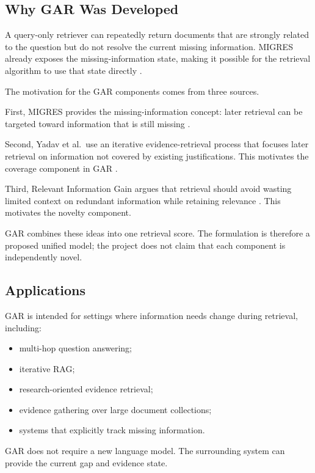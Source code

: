 \documentclass[11pt,a4paper]{article}
\begin{document}
\subsection{Why GAR Was Developed}

A query-only retriever can repeatedly return documents that are strongly related to the question but do not resolve the current missing information. MIGRES already exposes the missing-information state, making it possible for the retrieval algorithm to use that state directly \citep{wang-etal-2025-llms}.

The motivation for the GAR components comes from three sources.

First, MIGRES provides the missing-information concept: later retrieval can be targeted toward information that is still missing \citep{wang-etal-2025-llms}.

Second, Yadav et al.\ use an iterative evidence-retrieval process that focuses later retrieval on information not covered by existing justifications. This motivates the coverage component in GAR \citep{yadav-etal-2020-unsupervised}.

Third, Relevant Information Gain argues that retrieval should avoid wasting limited context on redundant information while retaining relevance \citep{pickett-etal-2024-rig}. This motivates the novelty component.

GAR combines these ideas into one retrieval score. The formulation is therefore a proposed unified model; the project does not claim that each component is independently novel.

\subsection{Applications}

GAR is intended for settings where information needs change during retrieval, including:

\begin{itemize}[leftmargin=1.5em]
\item multi-hop question answering;
\item iterative RAG;
\item research-oriented evidence retrieval;
\item evidence gathering over large document collections;
\item systems that explicitly track missing information.
\end{itemize}

GAR does not require a new language model. The surrounding system can provide the current gap and evidence state.
\end{document}
